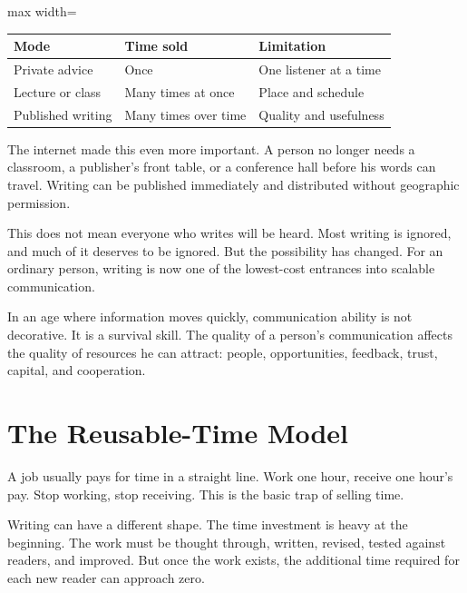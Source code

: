 \begin{center}
\begin{adjustbox}{max width=\linewidth}
\begin{tabular}{lll}
\hline
Mode & Time sold & Limitation \\
\hline
Private advice & Once & One listener at a time \\
Lecture or class & Many times at once & Place and schedule \\
Published writing & Many times over time & Quality and usefulness \\
\hline
\end{tabular}
\end{adjustbox}
\end{center}

The internet made this even more important. A person no longer needs a classroom, a publisher's front table, or a conference hall before his words can travel. Writing can be published immediately and distributed without geographic permission.

This does not mean everyone who writes will be heard. Most writing is ignored, and much of it deserves to be ignored. But the possibility has changed. For an ordinary person, writing is now one of the lowest-cost entrances into scalable communication.

In an age where information moves quickly, communication ability is not decorative. It is a survival skill. The quality of a person's communication affects the quality of resources he can attract: people, opportunities, feedback, trust, capital, and cooperation.

\section*{The Reusable-Time Model}

A job usually pays for time in a straight line. Work one hour, receive one hour's pay. Stop working, stop receiving. This is the basic trap of selling time.

Writing can have a different shape. The time investment is heavy at the beginning. The work must be thought through, written, revised, tested against readers, and improved. But once the work exists, the additional time required for each new reader can approach zero.

